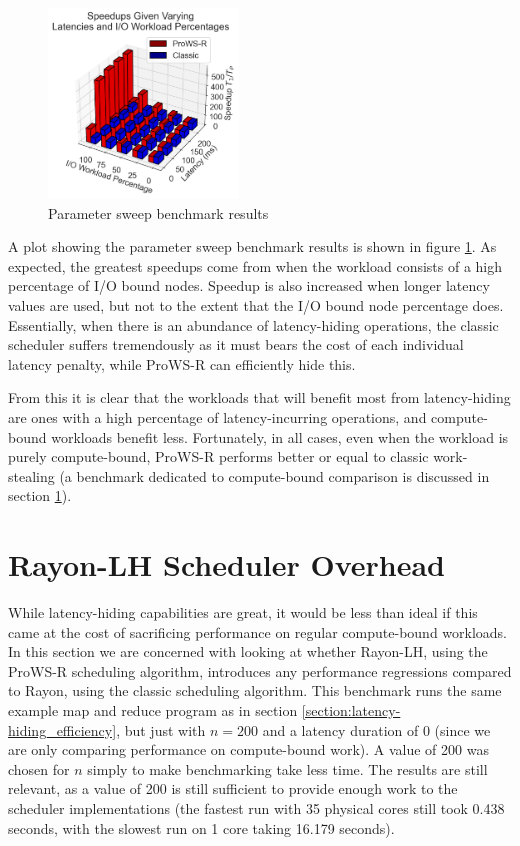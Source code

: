 \documentclass[bsc,frontabs,singlespacing,parskip,deptreport,normalheadings]{infthesis}
\begin{document}
\begin{figure}[ht]
    \centering
    \includegraphics[width=0.45\textwidth]{figures/param_sweep_plot.png}
    \caption{Parameter sweep benchmark results}
    \label{fig:param_sweep}
\end{figure}

A plot showing the parameter sweep benchmark results is shown in figure
\ref{fig:param_sweep}. As expected, the greatest speedups come from when the
workload consists of a high percentage of I/O bound nodes. Speedup is also
increased when longer latency values are used, but not to the extent that the
I/O bound node percentage does. Essentially, when there is an abundance of
latency-hiding operations, the classic scheduler suffers tremendously as it must
bears the cost of each individual latency penalty, while ProWS-R can efficiently
hide this.

From this it is clear that the workloads that will benefit most from
latency-hiding are ones with a high percentage of latency-incurring operations,
and compute-bound workloads benefit less. Fortunately, in all cases, even when
the workload is purely compute-bound, ProWS-R performs better or equal to
classic work-stealing (a benchmark dedicated to compute-bound comparison is
discussed in section \ref{section:rayon-lh_scheduler_overhead}).

\section{Rayon-LH Scheduler Overhead}
\label{section:rayon-lh_scheduler_overhead}

While latency-hiding capabilities are great, it would be less than ideal if this
came at the cost of sacrificing performance on regular compute-bound workloads.
In this section we are concerned with looking at whether Rayon-LH, using the
ProWS-R scheduling algorithm, introduces any performance regressions compared to
Rayon, using the classic scheduling algorithm. This benchmark runs the same
example map and reduce program as in section
\ref{section:latency-hiding_efficiency}, but just with \(n = 200\) and a latency
duration of 0 (since we are only comparing performance on compute-bound work). A
value of 200 was chosen for \(n\) simply to make benchmarking take less time.
The results are still relevant, as a value of 200 is still sufficient to provide
enough work to the scheduler implementations (the fastest run with 35 physical
cores still took 0.438 seconds, with the slowest run on 1 core taking 16.179
seconds).
\end{document}
